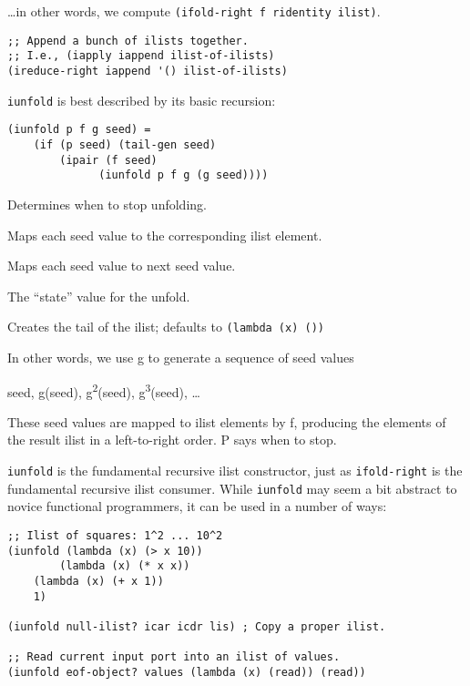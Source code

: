 \begin{description}
\ldots{}in other words, we compute
\texttt{(ifold-right\ f\ ridentity\ ilist)}.

\begin{verbatim}
;; Append a bunch of ilists together.
;; I.e., (iapply iappend ilist-of-ilists)
(ireduce-right iappend '() ilist-of-ilists)
\end{verbatim}
\item[ \href{}{} \texttt{iunfold} p f g seed {[}tail-gen{]}
-\textgreater{} ilist ]
\texttt{iunfold} is best described by its basic recursion:

\begin{verbatim}
(iunfold p f g seed) = 
    (if (p seed) (tail-gen seed)
        (ipair (f seed)
              (iunfold p f g (g seed))))
\end{verbatim}

\begin{description}
\tightlist
\item[ p ]
Determines when to stop unfolding.
\item[ f ]
Maps each seed value to the corresponding ilist element.
\item[ g ]
Maps each seed value to next seed value.
\item[ seed ]
The ``state'' value for the unfold.
\item[ tail-gen ]
Creates the tail of the ilist; defaults to
\texttt{(lambda\ (x)\ \textquotesingle{}())}
\end{description}

In other words, we use g to generate a sequence of seed values

seed, g(seed), g\textsuperscript{2}(seed), g\textsuperscript{3}(seed),
\ldots{}

These seed values are mapped to ilist elements by f, producing the
elements of the result ilist in a left-to-right order. P says when to
stop.

\texttt{iunfold} is the fundamental recursive ilist constructor, just as
\texttt{ifold-right} is the fundamental recursive ilist consumer. While
\texttt{iunfold} may seem a bit abstract to novice functional
programmers, it can be used in a number of ways:

\begin{verbatim}
;; Ilist of squares: 1^2 ... 10^2
(iunfold (lambda (x) (> x 10))
        (lambda (x) (* x x))
    (lambda (x) (+ x 1))
    1)
        
(iunfold null-ilist? icar icdr lis) ; Copy a proper ilist.

;; Read current input port into an ilist of values.
(iunfold eof-object? values (lambda (x) (read)) (read))


\end{verbatim}
\end{description}
